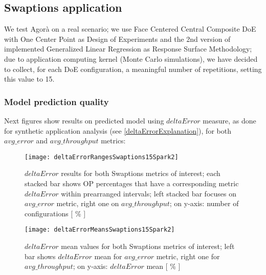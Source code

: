 \subsection{Swaptions application}

We test Agorà on a real scenario; we use Face Centered Central Composite DoE with One Center Point as Design of Experiments and the 2nd version of implemented Generalized Linear Regression as Response Surface Methodology; due to application computing kernel (Monte Carlo simulations), we have decided to collect, for each DoE configuration, a meaningful number of repetitions, setting this value to 15.


\subsubsection{Model prediction quality}

Next figures show results on predicted model using $deltaError$ measure, as done for synthetic application analysis (see \ref{deltaErrorExplanation}), for both $avg\_error$ and $avg\_throughput$ metrics:





\begin{figure}[h]

    \centering
    \texttt{[image: deltaErrorRangesSwaptions15Spark2]}
    \caption[$deltaError$ results for both Swaptions metrics of interest]{$deltaError$ results for both Swaptions metrics of interest; each stacked bar shows OP percentages that have a corresponding metric $deltaError$ within prearranged intervals; left stacked bar focuses on $avg\_error$ metric, right one on $avg\_throughput$; on y-axis: number of configurations [ \% ]}
    \label{fig::swaptions15spark2::intervals}
    
\end{figure}

\begin{figure}[h]

    \centering
    \texttt{[image: deltaErrorMeansSwaptions15Spark2]}
    \caption[$deltaError$ mean values for both Swaptions metrics of interest]{$deltaError$ mean values for both Swaptions metrics of interest; left bar shows $deltaError$ mean for $avg\_error$ metric, right one for $avg\_throughput$; on y-axis: $deltaError$ mean [ \% ]}
    \label{fig::swaptions15spark2::means}
    
\end{figure}





